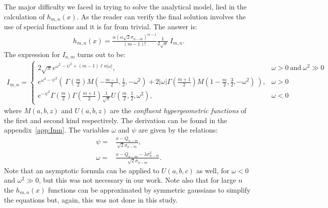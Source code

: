 \documentclass[a4paper,11pt]{article}
\begin{document}
The major difficulty we faced in trying to solve the analytical model, lied in the calculation of $h_{m,n}(x)$. 
As the reader can verify the final solution involves the use of special functions and it is far from trivial. 
The answer is:
\begin{align}
h_{m,n}(x) =  \frac{\alpha (\alpha\sqrt{2} \sigma_{n-m})^{m-1}}{(m-1)!} \frac{1}{2\sqrt{\pi}} \  I_{m,n}.
\end{align}  
The expression for $I_{n,m}$ turns out to be:
\begin{align}
I_{m,n} = 
\begin{cases}
2\sqrt{\pi}   e^{\omega^2 - \psi^2 + (m-1) \ell n |\omega|},  & \omega>0 \ \text{and} \  \omega^2 \gg 0\\
e^{\omega^2 -\psi^2 } \left(\  \Gamma\left( \frac{m}{2} \right) M\left(-\frac{m-1}{2}, \frac{1}{2}, -\omega^2 \right)  
+ 2|\omega| \Gamma\left( \frac{m+1}{2} \right) M\left(1-\frac{m}{2}, \frac{3}{2}, -\omega^2 \right)   \    \right), &  \omega > 0  \\
e^{ -\psi^2 } \Gamma\left( \frac{m}{2} \right)   \Gamma\left( \frac{m+1}{2} \right) \frac{1}{\sqrt{\pi}} U\left( \frac{m}{2}, \frac{1}{2}, \omega^2  \right), & \omega<0
\end{cases}
\nonumber
\end{align} 
where $M(a,b,z)$ and $U(a,b,z)$ are the \emph{confluent hypergeometric functions} of the first and second kind respectively. 
The derivation can be found in the appendix~\ref{app:Imn}. 
The variables $\omega$ and $\psi$ are given by the relations:
\begin{align}
\psi = & \frac{x-Q_{n-m}}{\sqrt{2}\sigma_{n-m}}, \\
\omega = & \frac{x-Q_{n-m} -\lambda\sigma^2_{n-m}}{\sqrt{2}\sigma_{n-m}}.
\end{align}  
Note that an asymptotic formula can be applied to $U(a,b,c)$ as well, for $\omega < 0$ and $\omega^2 \gg 0$, but this was not necessary in our work. 
Note also that for large $n$ the $h_{m,n}(x)$ functions can be approximated by symmetric gaussians to simplify the equations but, again, this was not done in this study. 
\end{document}
